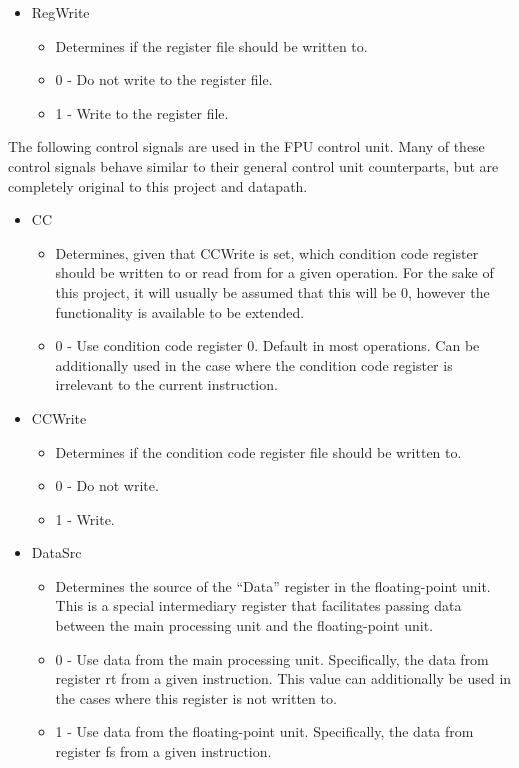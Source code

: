 \documentclass[
    paper=letter,
    parskip=half,
    fontsize=12pt,
    titlepage=firstiscover,
    toc=bibliography,
    numbers=endperiod
]{scrartcl}
\providecommand{\tightlist}{%
  \setlength{\itemsep}{0pt}\setlength{\parskip}{0pt}}
\begin{document}
\begin{itemize}
    \item RegWrite
    \begin{itemize}
        \tightlist
        \item Determines if the register file should be written to.
        \item 0 - Do not write to the register file.
        \item 1 - Write to the register file.
    \end{itemize}
\end{itemize}

The following control signals are used in the FPU control unit. Many of
these control signals behave similar to their general control unit
counterparts, but are completely original to this project and datapath.

\begin{itemize}
    \item CC
    \begin{itemize}
        \tightlist
        \item Determines, given that CCWrite is set, which condition code register
            should be written to or read from for a given operation. For the
            sake of this project, it will usually be assumed that this will be
            0, however the functionality is available to be extended.
        \item 0 - Use condition code register 0. Default in most operations. Can
            be additionally used in the case where the condition code register
            is irrelevant to the current instruction.
    \end{itemize}

    \item CCWrite
    \begin{itemize}
        \tightlist
        \item Determines if the condition code register file should be written to.
        \item 0 - Do not write.
        \item 1 - Write.
    \end{itemize}

    \item DataSrc
    \begin{itemize}
        \tightlist
        \item Determines the source of the ``Data'' register in the floating-point
            unit. This is a special intermediary register that facilitates
            passing data between the main processing unit and the floating-point
            unit.
        \item 0 - Use data from the main processing unit. Specifically, the data
            from register rt from a given instruction. This value can
            additionally be used in the cases where this register is not written
            to.
        \item 1 - Use data from the floating-point unit. Specifically, the data
            from register fs from a given instruction.
    \end{itemize}


\end{itemize}
\end{document}
